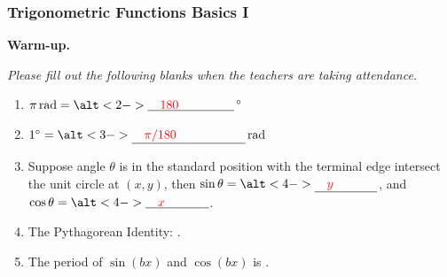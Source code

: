 \documentclass[10pt]{beamer}
\begin{document}
\begin{frame}
\frametitle{Trigonometric Functions Basics I}
\textbf{\large Warm-up.} 

\textit{Please fill out the following blanks when the teachers are taking attendance.}
\begin{enumerate}[label=\bullet]
\item 
$\pi\,\text{rad} = \alt<2->{\underline{{\color{red}\hspace{1em}180\hspace{1em}}}}{\underline{{\color{white}\hspace{1em}180\hspace{1em}}}}\,^\circ$\\[1em]
\item
$1^\circ = \alt<3->{\underline{{\color{red}\hspace{1em}\pi/180\hspace{1em}}}}{\underline{{\color{white}\hspace{1em}\pi/180\hspace{1em}}}}\,\text{rad}$\\[1em]
\item
Suppose angle $\theta$ is in the standard position with the terminal edge intersect the unit circle at $(x,y)$, then $\sin\theta =  \alt<4->{\underline{{\color{red}\hspace{1em}y\hspace{1em}}}}{\underline{{\color{white}\hspace{1em}y\hspace{1em}}}}$, and  $\cos\theta =  \alt<4->{\underline{{\color{red}\hspace{1em}x\hspace{1em}}}}{\underline{{\color{white}\hspace{1em}x\hspace{1em}}}}$.\\[1em]
\item
The Pythagorean Identity: .\\[1em]
\item The period of $\sin(bx)$ and $\cos(bx)$ is .\\[1em]\pause
\end{enumerate}
\end{frame}
\end{document}
